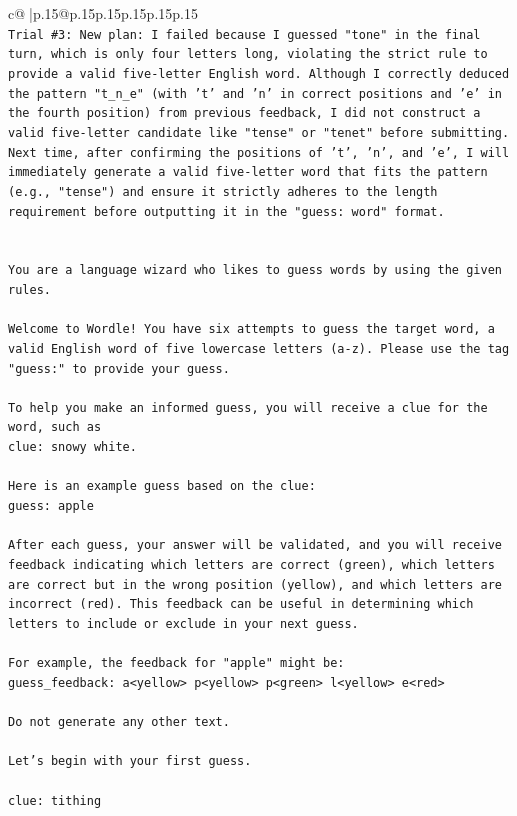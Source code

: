 \documentclass{article}
\begin{document}
{\begin{supertabular}{c@{$\;$}|p{.15\linewidth}@{}p{.15\linewidth}p{.15\linewidth}p{.15\linewidth}p{.15\linewidth}p{.15\linewidth}}
{{{\\ 
\texttt{Trial \#3: New plan: I failed because I guessed "tone" in the final turn, which is only four letters long, violating the strict rule to provide a valid five{-}letter English word. Although I correctly deduced the pattern "t\_n\_e" (with 't' and 'n' in correct positions and 'e' in the fourth position) from previous feedback, I did not construct a valid five{-}letter candidate like "tense" or "tenet" before submitting. Next time, after confirming the positions of 't', 'n', and 'e', I will immediately generate a valid five{-}letter word that fits the pattern (e.g., "tense") and ensure it strictly adheres to the length requirement before outputting it in the "guess: word" format.} \\
\\ 
\\ 
\texttt{You are a language wizard who likes to guess words by using the given rules.} \\
\\ 
\texttt{Welcome to Wordle! You have six attempts to guess the target word, a valid English word of five lowercase letters (a{-}z). Please use the tag "guess:" to provide your guess.} \\
\\ 
\texttt{To help you make an informed guess, you will receive a clue for the word, such as} \\
\texttt{clue: snowy white.} \\
\\ 
\texttt{Here is an example guess based on the clue: } \\
\texttt{guess: apple} \\
\\ 
\texttt{After each guess, your answer will be validated, and you will receive feedback indicating which letters are correct (green), which letters are correct but in the wrong position (yellow), and which letters are incorrect (red). This feedback can be useful in determining which letters to include or exclude in your next guess.} \\
\\ 
\texttt{For example, the feedback for "apple" might be:} \\
\texttt{guess\_feedback: a<yellow> p<yellow> p<green> l<yellow> e<red>} \\
\\ 
\texttt{Do not generate any other text.} \\
\\ 
\texttt{Let's begin with your first guess.} \\
\\ 
\texttt{clue: tithing} \\
            }
        }
    }
     \\ \\


\end{supertabular}}
\end{document}
